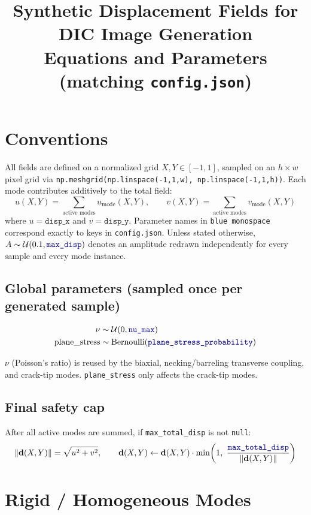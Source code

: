 \documentclass[11pt]{article}
\title{Synthetic Displacement Fields for DIC Image Generation \\
\large Equations and Parameters (matching \texttt{config.json})}
\author{}
\date{}
\newcommand{\param}[1]{\texttt{\color{blue!60!black}#1}}
\begin{document}
\maketitle

\section*{Conventions}

All fields are defined on a normalized grid $X, Y \in [-1, 1]$, sampled on an
$h \times w$ pixel grid via \texttt{np.meshgrid(np.linspace(-1,1,w), np.linspace(-1,1,h))}.
Each mode contributes additively to the total field:
\[
u(X,Y) = \sum_{\text{active modes}} u_{\text{mode}}(X,Y), \qquad
v(X,Y) = \sum_{\text{active modes}} v_{\text{mode}}(X,Y)
\]
where $u = \texttt{disp\_x}$ and $v = \texttt{disp\_y}$. Parameter names in
\param{blue monospace} correspond exactly to keys in \texttt{config.json}.
Unless stated otherwise, $A \sim \mathcal{U}(0.1, \param{max\_disp})$ denotes an
amplitude redrawn independently for every sample and every mode instance.

\subsection*{Global parameters (sampled once per generated sample)}

\begin{align}
\nu &\sim \mathcal{U}(0, \param{nu\_max}) \\
\text{plane\_stress} &\sim \text{Bernoulli}(\param{plane\_stress\_probability})
\end{align}

$\nu$ (Poisson's ratio) is reused by the biaxial, necking/barreling transverse
coupling, and crack-tip modes. \texttt{plane\_stress} only affects the
crack-tip modes.

\subsection*{Final safety cap}

After all active modes are summed, if \param{max\_total\_disp} is not \texttt{null}:
\[
\|\mathbf{d}(X,Y)\| = \sqrt{u^2 + v^2}, \qquad
\mathbf{d}(X,Y) \leftarrow \mathbf{d}(X,Y) \cdot
\min\!\left(1,\ \frac{\param{max\_total\_disp}}{\|\mathbf{d}(X,Y)\|}\right)
\]

\newpage
\section{Rigid / Homogeneous Modes}
\end{document}
